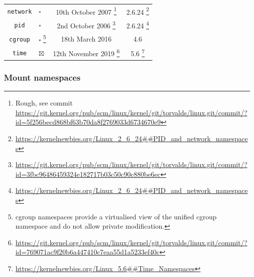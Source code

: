 \documentclass[sigplan]{acmart}
\begin{document}
\begin{table}
\begin{minipage}{\textwidth}
\begin{center}
\begin{tabular}{c|l|c|c}
        \texttt{network}
            & $\square$
            & 10th October 2007 \footnote{Rough, see commit \url{https://git.kernel.org/pub/scm/linux/kernel/git/torvalds/linux.git/commit/?id=5f256becd868bf63b70da8f2769033d6734670e9}}
            & 2.6.24 \footnote{\url{https://kernelnewbies.org/Linux_2_6_24##PID_and_network_namespaces}} \\
            
        \texttt{pid}
            & $\square$
            & 2nd October 2006 \footnote{\url{https://git.kernel.org/pub/scm/linux/kernel/git/torvalds/linux.git/commit/?id=3fbc96486459324e182717b03c50c90c880be6ec}}
            & 2.6.24 \footnote{\url{https://kernelnewbies.org/Linux_2_6_24##PID_and_network_namespaces}} \\
        
        \texttt{cgroup}
            & $\square$ \footnote{cgroup namespaces provide a virtualised view of the unified cgroup namespace and do not allow private modification.}
            & 18th March 2016 \citep{heo_git_2016}
            & 4.6 \citep{torvalds_linux_2016} \\

        \texttt{time}
            & $\boxtimes$
            & 12th November 2019 \footnote{\url{https://git.kernel.org/pub/scm/linux/kernel/git/torvalds/linux.git/commit/?id=769071ac9f20b6a447410c7eaa55d1a5233ef40c}}
            & 5.6 \footnote{\url{https://kernelnewbies.org/Linux_5.6##Time_Namespaces}}

    \end{tabular}
    \end{center}
    \end{minipage}
    
    \label{tab:namespaces}
\end{table}

\subsubsection{Mount namespaces}
\end{document}
